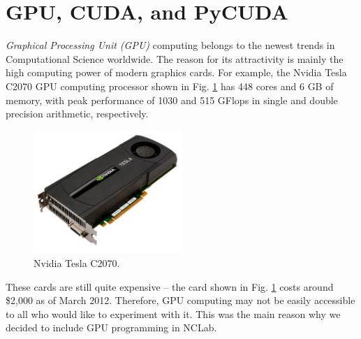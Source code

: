\documentclass{article}
\begin{document}

\normalsize

\newpage
\setcounter{tocdepth}{2}
\tableofcontents

\newpage

\pagestyle{plain}
\setcounter{page}{1}


\newpage

\pagestyle{plain}

\section{GPU, CUDA, and PyCUDA}

{\em Graphical Processing Unit (GPU)} computing belongs to the newest trends in
Computational Science worldwide. The reason for its attractivity is mainly 
the high computing power of modern graphics cards. For example, the 
Nvidia Tesla C2070 GPU computing processor shown in Fig. \ref{fig:tesla} 
has 448 cores and 6 GB of memory, with peak performance of 1030 and 515 
GFlops in single and double precision arithmetic, respectively.


\begin{figure}[!ht]
\begin{center}
\includegraphics[width=0.5\textwidth]{img/tesla.png}
\caption{Nvidia Tesla C2070.}
\label{fig:tesla}
\end{center}
\end{figure}
\noindent
These cards are still quite expensive -- the card shown in Fig. \ref{fig:tesla} costs 
around \$2,000 as of March 2012. Therefore, GPU computing may not be easily accessible 
to all who would like to experiment with it. This was the main reason why we decided to 
include GPU programming in NCLab. 
\end{document}
